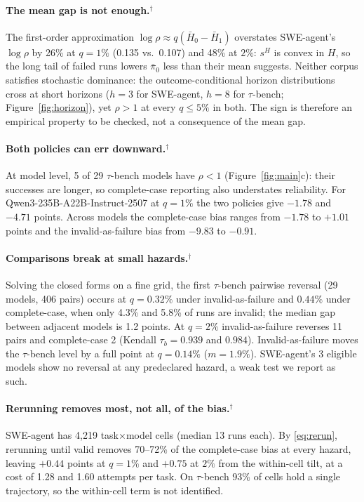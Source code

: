 \documentclass[letterpaper]{article} %
\newcommand{\pb}{\bar\pi}
\newcommand{\rev}{$^{\dagger}$}
\begin{document}
\paragraph{The mean gap is not enough.\rev} The first-order approximation
$\log\rho\approx q(\bar H_0-\bar H_1)$ overstates SWE-agent's $\log\rho$ by 26\%
at $q=1\%$ (0.135 vs.\ 0.107) and 48\% at $2\%$: $s^H$ is convex in $H$, so
the long tail of failed runs lowers $\pb_0$ less than their mean suggests. Neither corpus satisfies stochastic
dominance: the outcome-conditional horizon distributions cross at short
horizons ($h=3$ for SWE-agent, $h=8$ for $\tau$-bench; Figure~\ref{fig:horizon}), yet $\rho>1$ at every
$q\le5\%$ in both. The sign is therefore an empirical property to be checked,
not a consequence of the mean gap.

\paragraph{Both policies can err downward.\rev} At model level, 5 of 29
$\tau$-bench models have $\rho<1$ (Figure~\ref{fig:main}c): their successes are
longer, so complete-case reporting also understates reliability. For
Qwen3-235B-A22B-Instruct-2507 at $q=1\%$ the two policies give $-1.78$ and $-4.71$
points. Across models the complete-case bias ranges from $-1.78$ to $+1.01$
points and the invalid-as-failure bias from $-9.83$ to $-0.91$.

\paragraph{Comparisons break at small hazards.\rev} Solving the closed forms on
a fine grid, the first $\tau$-bench pairwise reversal (29 models, 406 pairs)
occurs at $q=0.32\%$ under invalid-as-failure and $0.44\%$ under complete-case,
when only 4.3\% and 5.8\% of runs are invalid; the median gap between adjacent
models is 1.2 points. At $q=2\%$ invalid-as-failure reverses 11 pairs and
complete-case 2 (Kendall $\tau_b=0.939$ and $0.984$). Invalid-as-failure moves the $\tau$-bench
level by a full point at $q=0.14\%$ ($m=1.9\%$). SWE-agent's 3 eligible models
show no reversal at any predeclared hazard, a weak test we report as such.

\paragraph{Rerunning removes most, not all, of the bias.\rev} SWE-agent has
4{,}219 task$\times$model cells (median 13 runs each). By \eqref{eq:rerun},
rerunning until valid removes 70--72\% of the complete-case bias at every hazard,
leaving $+0.44$ points at $q=1\%$ and $+0.75$ at $2\%$ from the within-cell
tilt, at a cost of 1.28 and 1.60 attempts per task. On $\tau$-bench 93\% of
cells hold a single trajectory, so the within-cell term is not identified.
\end{document}
